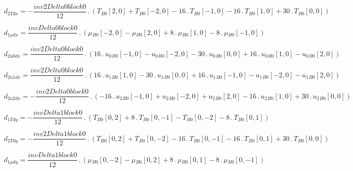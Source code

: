 \documentclass{article}
\begin{document}
\begin{dmath}d_{2 T dx} = - \frac{inv2Delta0block0}{12} \,.\, \left({T{_{B0}}}[{2,0}] + {T{_{B0}}}[{-2,0}] - 16 \,.\, {T{_{B0}}}[{-1,0}] - 16 \,.\, {T{_{B0}}}[{1,0}] + 30 \,.\, {T{_{B0}}}[{0,0}]\right)\end{dmath}

\begin{dmath}d_{1 \mu dx} = \frac{invDelta0block0}{12} \,.\, \left({\mu{_{B0}}}[{-2,0}] - {\mu{_{B0}}}[{2,0}] + 8 \,.\, {\mu{_{B0}}}[{1,0}] - 8 \,.\, {\mu{_{B0}}}[{-1,0}]\right)\end{dmath}

\begin{dmath}d_{2 u0 dx} = \frac{inv2Delta0block0}{12} \,.\, \left(16 \,.\, {u_{0}{_{B0}}}[{-1,0}] - {u_{0}{_{B0}}}[{-2,0}] - 30 \,.\, {u_{0}{_{B0}}}[{0,0}] + 16 \,.\, {u_{0}{_{B0}}}[{1,0}] - {u_{0}{_{B0}}}[{2,0}]\right)\end{dmath}

\begin{dmath}d_{2 u1 dx} = \frac{inv2Delta0block0}{12} \,.\, \left(16 \,.\, {u_{1}{_{B0}}}[{1,0}] - 30 \,.\, {u_{1}{_{B0}}}[{0,0}] + 16 \,.\, {u_{1}{_{B0}}}[{-1,0}] - {u_{1}{_{B0}}}[{-2,0}] - {u_{1}{_{B0}}}[{2,0}]\right)\end{dmath}

\begin{dmath}d_{2 u2 dx} = - \frac{inv2Delta0block0}{12} \,.\, \left(- 16 \,.\, {u_{2}{_{B0}}}[{-1,0}] + {u_{2}{_{B0}}}[{-2,0}] + {u_{2}{_{B0}}}[{2,0}] - 16 \,.\, {u_{2}{_{B0}}}[{1,0}] + 30 \,.\, {u_{2}{_{B0}}}[{0,0}]\right)\end{dmath}

\begin{dmath}d_{1 T dy} = - \frac{invDelta1block0}{12} \,.\, \left({T{_{B0}}}[{0,2}] + 8 \,.\, {T{_{B0}}}[{0,-1}] - {T{_{B0}}}[{0,-2}] - 8 \,.\, {T{_{B0}}}[{0,1}]\right)\end{dmath}

\begin{dmath}d_{2 T dy} = - \frac{inv2Delta1block0}{12} \,.\, \left({T{_{B0}}}[{0,2}] + {T{_{B0}}}[{0,-2}] - 16 \,.\, {T{_{B0}}}[{0,-1}] - 16 \,.\, {T{_{B0}}}[{0,1}] + 30 \,.\, {T{_{B0}}}[{0,0}]\right)\end{dmath}

\begin{dmath}d_{1 \mu dy} = \frac{invDelta1block0}{12} \,.\, \left({\mu{_{B0}}}[{0,-2}] - {\mu{_{B0}}}[{0,2}] + 8 \,.\, {\mu{_{B0}}}[{0,1}] - 8 \,.\, {\mu{_{B0}}}[{0,-1}]\right)\end{dmath}
\end{document}
